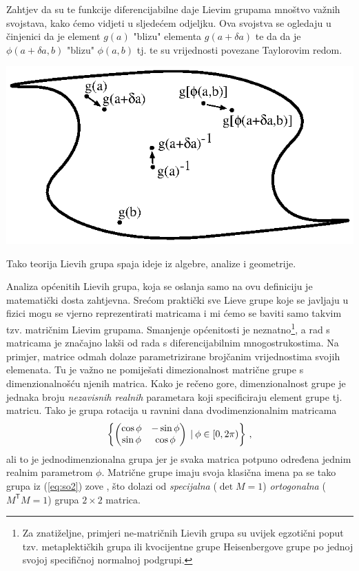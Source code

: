 Zahtjev da su te funkcije diferencijabilne daje Lievim grupama mnoštvo važnih svojstava,
kako ćemo vidjeti u sljedećem odjeljku.
Ova svojstva se ogledaju
u činjenici da je element $g(a)$ "blizu" elementa $g(a+\delta a)$ te da
da je $\phi(a+\delta a, b)$
"blizu" $\phi(a,b)$ tj. te su vrijednosti povezane Taylorovim redom.
\centerline{\includegraphics[scale=1.0]{pics/lieva_mnogostrukost.eps}}
Tako teorija Lievih grupa spaja ideje iz algebre, analize i geometrije.

Analiza općenitih Lievih grupa, koja se oslanja samo na ovu definiciju
je matematički dosta zahtjevna. Srećom praktički sve Lieve grupe koje se javljaju
u fizici mogu se vjerno reprezentirati matricama i mi ćemo se baviti
samo takvim tzv. matričnim Lievim grupama. Smanjenje općenitosti je neznatno\footnote{Za
    znatiželjne, primjeri ne-matričnih Lievih grupa su uvijek egzotični
    poput tzv. metaplektičkih grupa ili kvocijentne grupe Heisenbergove grupe po
jednoj svojoj specifičnoj normalnoj podgrupi.\label{fus:nematricne}},
a rad s matricama je značajno lakši od rada s diferencijabilnim mnogostrukostima.
Na primjer, matrice odmah dolaze parametrizirane brojčanim vrijednostima svojih
elemenata. Tu je važno
ne pomiješati dimezionalnost matrične grupe s dimenzionalnošću njenih matrica.
Kako je rečeno gore, dimenzionalnost grupe je jednaka broju \emph{nezavisnih realnih}
parametara koji specificiraju element grupe tj. matricu. Tako je grupa rotacija
u ravnini dana dvodimenzionalnim matricama
\begin{equation}
    \left\{ \begin{pmatrix}
        \cos\phi & -\sin\phi \\
        \sin\phi & \cos\phi 
    \end{pmatrix} 
     \: | \: \phi \in [0, 2\pi) \right\} \,,
    \label{eq:so2}
\end{equation}
ali to je jednodimenzionalna grupa jer je svaka matrica potpuno određena
jednim realnim parametrom $\phi$. Matrične grupe imaju svoja klasična
imena pa se tako grupa iz (\ref{eq:so2}) zove , što dolazi
od \emph{specijalna} ($\det M = 1$) \emph{ortogonalna} ($M^\mathsf{T} M = 1$) 
grupa $2\times 2$ matrica.


